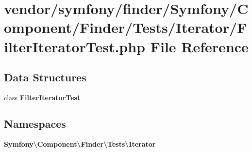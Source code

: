 \section{vendor/symfony/finder/\+Symfony/\+Component/\+Finder/\+Tests/\+Iterator/\+Filter\+Iterator\+Test.php File Reference}
\label{_filter_iterator_test_8php}
\subsection*{Data Structures}
\begin{DoxyCompactItemize}
\item 
class {\bf Filter\+Iterator\+Test}
\end{DoxyCompactItemize}
\subsection*{Namespaces}
\begin{DoxyCompactItemize}
\item 
 {\bf Symfony\textbackslash{}\+Component\textbackslash{}\+Finder\textbackslash{}\+Tests\textbackslash{}\+Iterator}
\end{DoxyCompactItemize}
